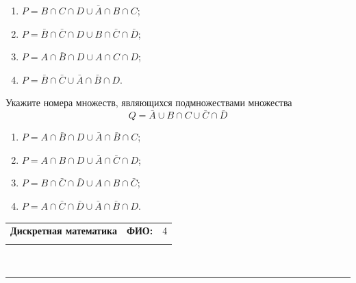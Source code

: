 \documentclass[10pt]{exam}
\newcommand{\class}{Дискретная математика}
\newcommand{\examdate}{}
\begin{document}
\begin{questions}
\begin{enumerate}
	\renewcommand{\labelenumi}{\arabic{enumi})}
	\item $P = B \cap C \cap D \cup \bar{A} \cap B \cap C$;
	\item $P = \bar{B} \cap \bar{C} \cap D \cup B \cap \bar{C} \cap \bar{D}$;
	\item $P = A \cap \bar{B} \cap D \cup A \cap C \cap D$;
	\item $P = \bar{B} \cap \bar{C} \cup \bar{A} \cap \bar{B} \cap D$.
\end{enumerate}
\question
Укажите номера множеств, являющихся подмножествами множества
\begin{equation*}
	Q = \bar{A} \cup B \cap C \cup \bar{C} \cap \bar{D}
\end{equation*}

\begin{enumerate}
	\renewcommand{\labelenumi}{\arabic{enumi})}
	\item $P = A \cap \bar{B} \cap D \cup \bar{A} \cap \bar{B} \cap C$;
	\item $P = A \cap B \cap D \cup \bar{A} \cap \bar{C} \cap D$;
	\item $P = B \cap \bar{C} \cap \bar{D} \cup A \cap B \cap \bar{C}$;
	\item $P = A \cap \bar{C} \cap \bar{D} \cup \bar{A} \cap \bar{B} \cap D$.
\end{enumerate}


\end{questions}
\newpage
\begin{flushright}
\begin{tabular}{p{2.8in} r l}
\textbf{\class} & \textbf{ФИО:} &4\\

\textbf{\examdate} &&\\
\end{tabular}\\
\end{flushright}
\rule[1ex]{\textwidth}{.1pt}
\end{document}
